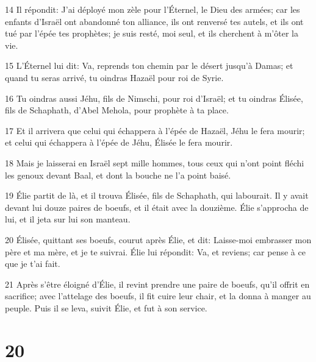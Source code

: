 \par 14 Il répondit: J'ai déployé mon zèle pour l'Éternel, le Dieu des armées; car les enfants d'Israël ont abandonné ton alliance, ils ont renversé tes autels, et ils ont tué par l'épée tes prophètes; je suis resté, moi seul, et ils cherchent à m'ôter la vie.
\par 15 L'Éternel lui dit: Va, reprends ton chemin par le désert jusqu'à Damas; et quand tu seras arrivé, tu oindras Hazaël pour roi de Syrie.
\par 16 Tu oindras aussi Jéhu, fils de Nimschi, pour roi d'Israël; et tu oindras Élisée, fils de Schaphath, d'Abel Mehola, pour prophète à ta place.
\par 17 Et il arrivera que celui qui échappera à l'épée de Hazaël, Jéhu le fera mourir; et celui qui échappera à l'épée de Jéhu, Élisée le fera mourir.
\par 18 Mais je laisserai en Israël sept mille hommes, tous ceux qui n'ont point fléchi les genoux devant Baal, et dont la bouche ne l'a point baisé.
\par 19 Élie partit de là, et il trouva Élisée, fils de Schaphath, qui labourait. Il y avait devant lui douze paires de boeufs, et il était avec la douzième. Élie s'approcha de lui, et il jeta sur lui son manteau.
\par 20 Élisée, quittant ses boeufs, courut après Élie, et dit: Laisse-moi embrasser mon père et ma mère, et je te suivrai. Élie lui répondit: Va, et reviens; car pense à ce que je t'ai fait.
\par 21 Après s'être éloigné d'Élie, il revint prendre une paire de boeufs, qu'il offrit en sacrifice; avec l'attelage des boeufs, il fit cuire leur chair, et la donna à manger au peuple. Puis il se leva, suivit Élie, et fut à son service.

\chapter{20}

